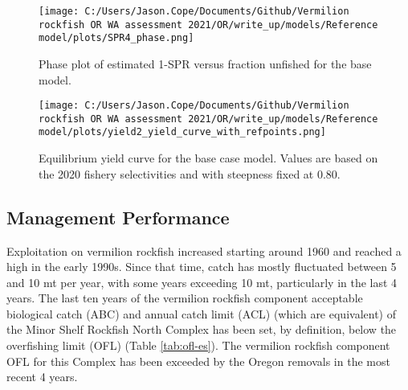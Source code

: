 \documentclass[11pt,
  english,
  a4paper,
]{article}
\begin{document}

\begin{figure}
\centering
\texttt{[image: C:/Users/Jason.Cope/Documents/Github/Vermilion rockfish OR WA assessment 2021/OR/write\_up/models/Reference model/plots/SPR4\_phase.png]}
\caption{Phase plot of estimated 1-SPR versus fraction unfished for the base model.\label{fig:es-phase}}
\end{figure}

\tagmcend\tagstructend


\begin{figure}
\centering
\texttt{[image: C:/Users/Jason.Cope/Documents/Github/Vermilion rockfish OR WA assessment 2021/OR/write\_up/models/Reference model/plots/yield2\_yield\_curve\_with\_refpoints.png]}
\caption{Equilibrium yield curve for the base case model. Values are based on the 2020 fishery selectivities and with steepness fixed at 0.80.\label{fig:es-yield}}
\end{figure}

\tagmcend\tagstructend



\clearpage


\hypertarget{management-performance}{%
\subsection*{Management Performance}\label{management-performance}}

\leavevmode\tagmcend\tagstructend


Exploitation on vermilion rockfish increased starting around 1960 and reached a high in the early 1990s. Since that time, catch has mostly fluctuated between 5 and 10 mt per year, with some years exceeding 10 mt, particularly in the last 4 years. The last ten years of the vermilion rockfish component acceptable biological catch (ABC) and annual catch limit (ACL) (which are equivalent) of the Minor Shelf Rockfish North Complex has been set, by definition, below the overfishing limit (OFL) (Table \ref{tab:ofl-es}). The vermilion rockfish component OFL for this Complex has been exceeded by the Oregon removals in the most recent 4 years.
\end{document}
